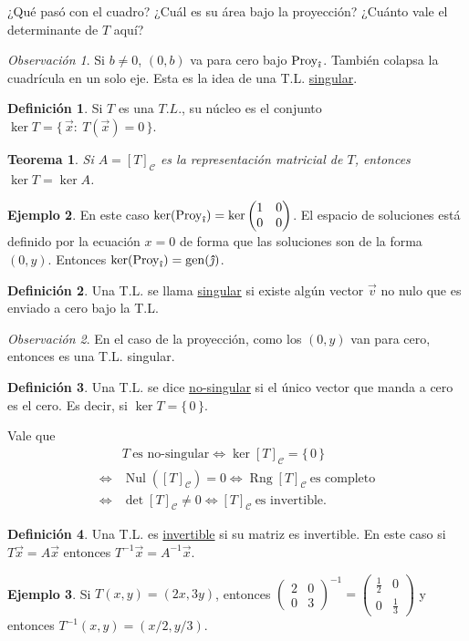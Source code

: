 \documentclass[12pt]{article}
\theoremstyle{plain}
\newtheorem{Th}{Teorema}  %
\theoremstyle{definition}
\newtheorem*{Def}{Definición}       %
\newtheorem{Ex}[Th]{Ejemplo}           %
\theoremstyle{remark}
\newtheorem*{Rmk}{Observación}      %
\DeclareMathOperator{\gen}{gen}     %
\DeclareMathOperator{\Rng}{Rng}     %
\DeclareMathOperator{\Nul}{Nul}     %
\DeclareMathOperator{\Proy}{Proy}   %
\newcommand{\ii}{\vu{\imath}}
\newcommand{\jj}{\vu{\jmath}}
\newcommand{\cC}{\mathcal{C}}       %
\renewcommand{\:}{\colon}           %
\newcommand{\un}[1]{\underline{#1}}
\renewcommand{\.}{\Cdot}                %
\newcommand{\twobytwo}[4]{\begin{pmatrix} %
    #1 & #2 \\ #3 & #4 \end{pmatrix}}
\newcommand{\set}[1]{\{\,#1\,\}}    %
\begin{document}
\begin{multicols}{2}
\begin{ptcbP}
    ¿Qué pasó con el cuadro? ¿Cuál es su área bajo la proyección? ¿Cuánto vale el determinante de $T$ aquí?
\end{ptcbP}
\begin{Rmk}
    Si $b\neq 0$, $(0,b)$ va para cero bajo $\Proy_{\ii}$. También colapsa la cuadrícula en un solo eje. Esta es la idea de una T.L. \un{singular}.
\end{Rmk}

\begin{Def}
    Si $T$ es una $T.L.$, su núcleo es el conjunto $\ker T=\set{\vec{x}:\ T(\vec{x})=0}$.
\end{Def}

\begin{Th}
    Si $A=[T]_\cC$ es la representación matricial de $T$, entonces $\ker T= \ker A$.
\end{Th}

\begin{Ex}
    En este caso $\ker (\Proy_{\ii})=\ker\twobytwo{1}{0}{0}{0}$. El espacio de soluciones está definido por la ecuación $x=0$ de forma que las soluciones son de la forma $(0,y)$. Entonces $\ker (\Proy_{\ii})=\gen(\jj)$.
\end{Ex}

\begin{Def}
    Una T.L. se llama \un{singular} si existe algún vector $\vec{v}$ no nulo que es enviado a cero bajo la T.L.
\end{Def}

\begin{Rmk}
    En el caso de la proyección, como los $(0,y)$ van para cero, entonces es una T.L. singular.
\end{Rmk}

\begin{Def}
    Una T.L. se dice \un{no-singular} si el único vector que manda a cero es el cero. Es decir, si $\ker T=\set{0}$.
\end{Def}
Vale que 
\begin{align*}  
    &T\ \text{es no-singular}\iff\ker[T]_\cC=\set{0}\\
    \iff&\Nul([T]_\cC)=0\iff\Rng[T]_\cC\ \text{es completo}\\
    \iff&\det[T]_\cC\neq 0\iff[T]_\cC\ \text{es invertible}.
\end{align*}

\begin{Def}
    Una T.L. es \un{invertible} si su matriz es invertible. En este caso si $T\vec{x}=A\vec{x}$ entonces $T^{-1}\vec{x}=A^{-1}\vec{x}$.
\end{Def}

\begin{Ex}
    Si $T(x,y)=(2x,3y)$, entonces $\twobytwo{2}{0}{0}{3}^{-1}=\twobytwo{\frac12}{0}{0}{\frac13}$ y entonces $T^{-1}(x,y)=(x/2,y/3)$.
\end{Ex}
\end{multicols}
\end{document}
